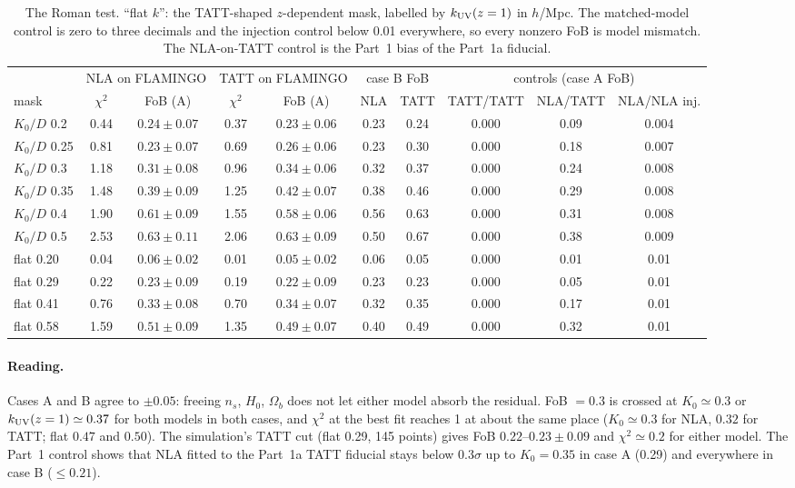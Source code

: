 \documentclass[11pt]{article}
\begin{document}
\begin{table}[H]\centering\footnotesize\setlength{\tabcolsep}{4pt}
\begin{tabular}{l|cc|cc|cc|ccc}
\toprule
 & \multicolumn{2}{c|}{NLA on FLAMINGO} & \multicolumn{2}{c|}{TATT on FLAMINGO} & \multicolumn{2}{c|}{case B FoB} & \multicolumn{3}{c}{controls (case A FoB)}\\
mask & $\chi^2$ & FoB (A) & $\chi^2$ & FoB (A) & NLA & TATT & TATT/TATT & NLA/TATT & NLA/NLA inj.\\
\midrule
$K_0/D$ 0.2 & 0.44 & $0.24\pm0.07$ & 0.37 & $0.23\pm0.06$ & 0.23 & 0.24 & 0.000 & 0.09 & 0.004\\
$K_0/D$ 0.25 & 0.81 & $0.23\pm0.07$ & 0.69 & $0.26\pm0.06$ & 0.23 & 0.30 & 0.000 & 0.18 & 0.007\\
$K_0/D$ 0.3 & 1.18 & $0.31\pm0.08$ & 0.96 & $0.34\pm0.06$ & 0.32 & 0.37 & 0.000 & 0.24 & 0.008\\
$K_0/D$ 0.35 & 1.48 & $0.39\pm0.09$ & 1.25 & $0.42\pm0.07$ & 0.38 & 0.46 & 0.000 & 0.29 & 0.008\\
$K_0/D$ 0.4 & 1.90 & $0.61\pm0.09$ & 1.55 & $0.58\pm0.06$ & 0.56 & 0.63 & 0.000 & 0.31 & 0.008\\
$K_0/D$ 0.5 & 2.53 & $0.63\pm0.11$ & 2.06 & $0.63\pm0.09$ & 0.50 & 0.67 & 0.000 & 0.38 & 0.009\\
\midrule
flat 0.20 & 0.04 & $0.06\pm0.02$ & 0.01 & $0.05\pm0.02$ & 0.06 & 0.05 & 0.000 & 0.01 & 0.01\\
flat 0.29 & 0.22 & $0.23\pm0.09$ & 0.19 & $0.22\pm0.09$ & 0.23 & 0.23 & 0.000 & 0.05 & 0.01\\
flat 0.41 & 0.76 & $0.33\pm0.08$ & 0.70 & $0.34\pm0.07$ & 0.32 & 0.35 & 0.000 & 0.17 & 0.01\\
flat 0.58 & 1.59 & $0.51\pm0.09$ & 1.35 & $0.49\pm0.07$ & 0.40 & 0.49 & 0.000 & 0.32 & 0.01\\
\bottomrule
\end{tabular}
\caption{The Roman test. ``flat $k$'': the TATT-shaped $z$-dependent mask, labelled by $k_{\rm UV}(z=1)$ in $h$/Mpc. The matched-model control is zero to three decimals and the injection control below 0.01 everywhere, so every nonzero FoB is model mismatch. The NLA-on-TATT control is the Part~1 bias of the Part~1a fiducial.}\label{tab:romantest}
\end{table}

\paragraph{Reading.} Cases A and B agree to $\pm0.05$: freeing $n_s$, $H_0$, $\Omega_b$ does not let either model absorb the residual. FoB $=0.3$ is crossed at $K_0\simeq0.3$ or $k_{\rm UV}(z=1)\simeq0.37$ for both models in both cases, and $\chi^2$ at the best fit reaches 1 at about the same place ($K_0\simeq0.3$ for NLA, $0.32$ for TATT; flat $0.47$ and $0.50$). The simulation's TATT cut (flat 0.29, 145 points) gives FoB $0.22$--$0.23\pm0.09$ and $\chi^2\simeq0.2$ for either model. The Part~1 control shows that NLA fitted to the Part~1a TATT fiducial stays below $0.3\sigma$ up to $K_0=0.35$ in case A (0.29) and everywhere in case B ($\le0.21$).
\end{document}
